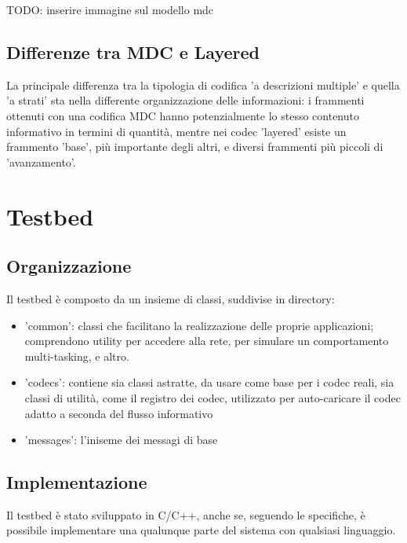 TODO: inserire immagine sul modello mdc

\subsection{Differenze tra MDC e Layered}

La principale differenza tra la tipologia di codifica 'a descrizioni multiple' e
quella 'a strati' sta nella differente organizzazione delle informazioni: i
frammenti ottenuti con una codifica MDC hanno potenzialmente lo stesso contenuto
informativo in termini di quantità, mentre nei codec 'layered' esiste un
frammento 'base', più importante degli altri, e diversi frammenti più piccoli di
'avanzamento'.






\section{Testbed}



\subsection{Organizzazione}


Il testbed è composto da un insieme di classi, suddivise in directory:



\begin{itemize}
\item 'common': classi che facilitano la realizzazione delle proprie applicazioni; comprendono utility per accedere alla rete, per simulare un comportamento multi-tasking, e altro.

\item 'codecs': contiene sia classi astratte, da usare come base per i codec
reali, sia classi di utilità, come il registro dei codec, utilizzato per auto-caricare il codec adatto a seconda del flusso informativo

\item 'messages': l'iniseme dei messagi di base
\end{itemize}




\subsection{Implementazione}


Il testbed è stato sviluppato in C/C++, anche se, seguendo le specifiche, è
possibile implementare una qualunque parte del sistema con qualsiasi linguaggio.

